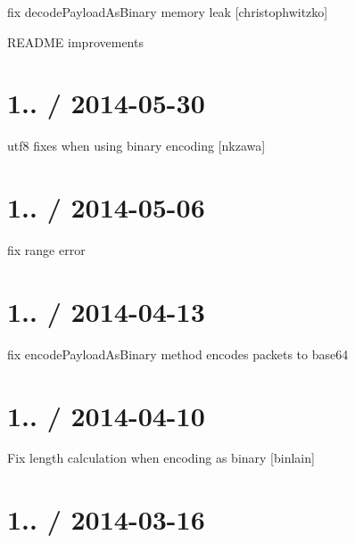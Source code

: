 \begin{DoxyItemize}
\item fix decode\+Payload\+As\+Binary memory leak \mbox{[}christophwitzko\mbox{]}
\item R\+E\+A\+D\+ME improvements
\end{DoxyItemize}

\section*{1.. / 2014-\/05-\/30 }


\begin{DoxyItemize}
\item utf8 fixes when using binary encoding \mbox{[}nkzawa\mbox{]}
\end{DoxyItemize}

\section*{1.. / 2014-\/05-\/06 }


\begin{DoxyItemize}
\item fix range error
\end{DoxyItemize}

\section*{1.. / 2014-\/04-\/13 }


\begin{DoxyItemize}
\item fix {\ttfamily encode\+Payload\+As\+Binary} method encodes packets to base64
\end{DoxyItemize}

\section*{1.. / 2014-\/04-\/10 }


\begin{DoxyItemize}
\item Fix length calculation when encoding as binary \mbox{[}binlain\mbox{]}
\end{DoxyItemize}

\section*{1.. / 2014-\/03-\/16 }


